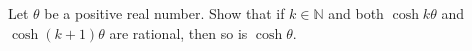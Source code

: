 Let \(\theta\) be a positive real number. Show that if \(k\in \mathbb{N}\) and both \(\cosh k \theta\) and \(\cosh(k+1) \theta\) are rational, then so is \(\cosh \theta\).